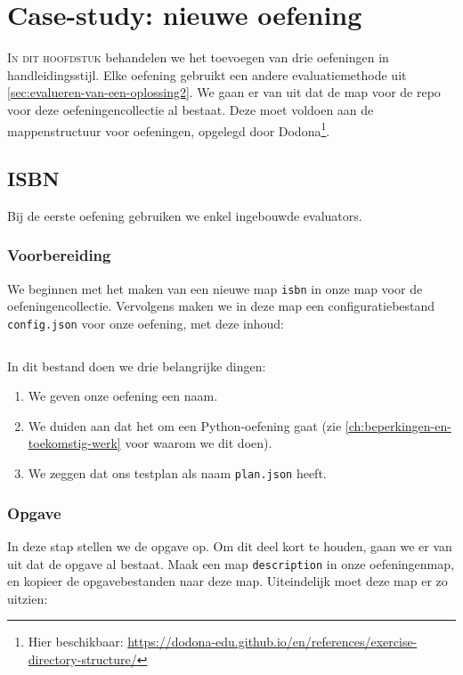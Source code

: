 \chapter{Case-study: nieuwe oefening}\label{ch:nieuwe-oefening}

\lettrine{I}{n dit hoofdstuk} behandelen we het toevoegen van drie oefeningen in handleidingsstijl.
Elke oefening gebruikt een andere evaluatiemethode uit \cref{sec:evalueren-van-een-oplossing2}.
We gaan er van uit dat de map voor de repo voor deze oefeningencollectie al bestaat.
Deze moet voldoen aan de mappenstructuur voor oefeningen, opgelegd door Dodona\footnote{Hier beschikbaar: \url{https://dodona-edu.github.io/en/references/exercise-directory-structure/}}.

\section{ISBN}\label{sec:isbn}

Bij de eerste oefening gebruiken we enkel ingebouwde evaluators.

\subsection{Voorbereiding}\label{subsec:voorbereiding}

We beginnen met het maken van een nieuwe map \texttt{isbn} in onze map voor de oefeningencollectie.
Vervolgens maken we in deze map een configuratiebestand \texttt{config.json} voor onze oefening, met deze inhoud:

\inputminted{json}{../../exercise/isbn/config.json}

In dit bestand doen we drie belangrijke dingen:
\begin{enumerate}
    \item We geven onze oefening een naam.
    \item We duiden aan dat het om een Python-oefening gaat (zie \cref{ch:beperkingen-en-toekomstig-werk} voor waarom we dit doen).
    \item We zeggen dat ons testplan als naam \texttt{plan.json} heeft.
\end{enumerate}

\subsection{Opgave}\label{subsec:opgave}

In deze stap stellen we de opgave op.
Om dit deel kort te houden, gaan we er van uit dat de opgave al bestaat.
Maak een map \texttt{description} in onze oefeningenmap, en kopieer de opgavebestanden naar deze map.
Uiteindelijk moet deze map er zo uitzien:


